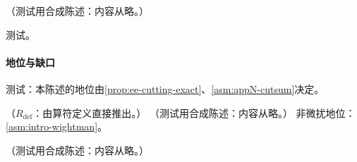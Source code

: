 \begin{remark}\label{rem:prelim-cutting-dr}
（测试用合成陈述：内容从略。）
\end{remark}
\begin{proofsketch}测试。\end{proofsketch}
\paragraph{地位与缺口}测试：本陈述的地位由\cref{prop:ee-cutting-exact}、\cref{asm:appN-cutsum}决定。

\begin{proposition}\label{prop:prelim-optical}
（$R_{\mathrm{def}}$：由算符定义直接推出。）
（测试用合成陈述：内容从略。）
非微扰地位：\cref{asm:intro-wightman}。
\end{proposition}

\begin{example}[维数正规化中的单圈无质量流关联函数]\label{ex:prelim-vacpol}
（测试用合成陈述：内容从略。）
\end{example}
